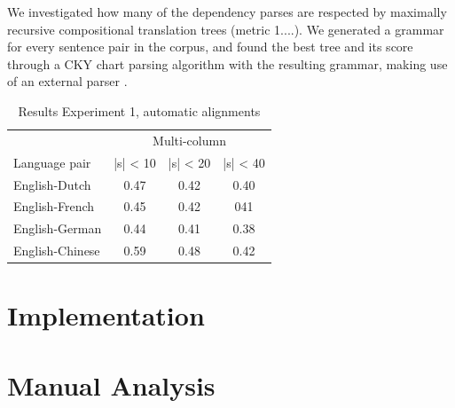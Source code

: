 \documentclass{report}
\theoremstyle{definition}
\theoremstyle{plain}
\begin{document}
We investigated how many of the dependency parses are respected by maximally recursive compositional translation trees (metric 1....). We generated a grammar for every sentence pair in the corpus, and found the best tree and its score through a CKY chart parsing algorithm with the resulting grammar, making use of an external parser \citep{bird2009natural}. 

\begin{table}[!h]
\centering
\begin{tabular}{l|ccc}
& \multicolumn{3}{c}{Multi-column}\\
Language pair & |s| < 10 & |s| < 20 & |s| < 40\\
\hline
English-Dutch & 0.47 & 0.42 & 0.40 \\
English-French & 0.45 & 0.42 & 041 \\
English-German & 0.44 & 0.41 & 0.38 \\
English-Chinese & 0.59 & 0.48 & 0.42\\
\end{tabular}
\caption{Results Experiment 1, automatic alignments}\label{tab:scores1}
\end{table}

\appendix
\chapter{Implementation}
\label{appendix:impl}

\chapter{Manual Analysis}
\label{appendix:analysis}




\end{document}
